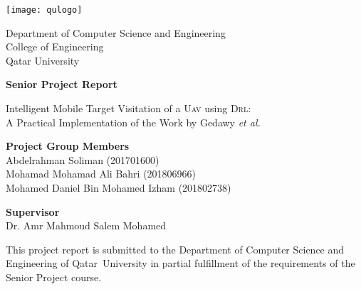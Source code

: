 \documentclass[../main.tex]{subfiles}
\begin{document}


        \centering
        \texttt{[image: qulogo]}

        \Large
        Department of Computer Science and Engineering\\
        College of Engineering\\
        Qatar University\\

        \vspace{2.5cm}

        \Huge
        \textbf{Senior Project Report}

        \vspace{1.0cm}
        \Large
        Intelligent Mobile Target Visitation of a \textsc{Uav} using \textsc{Drl}:\\
        A Practical Implementation of the Work by Gedawy \textit{et al.}

        \vspace{2.5cm}

        \raggedright
        \large
        \-\hspace{0.8cm} \textbf{Project Group Members}\\
        \normalsize
        \medskip
        \-\hspace{1.3cm} Abdelrahman Soliman (201701600)\\
        \-\hspace{1.3cm} Mohamad Mohamad Ali Bahri (201806966)\\
        \-\hspace{1.3cm} Mohamed Daniel Bin Mohamed Izham (201802738)\\

        \vspace{1.0cm}

        \large
        \-\hspace{0.8cm} \textbf{Supervisor}\\
        \normalsize
        \medskip
        \-\hspace{1.3cm} Dr. Amr Mahmoud Salem Mohamed\\

        \vfill

        \small

        This project report is submitted to the Department
        of Computer Science and Engineering of Qatar~University 
        in partial fulfillment of the
        requirements of the Senior Project course.

        \vspace{0.8cm}
\end{document}
